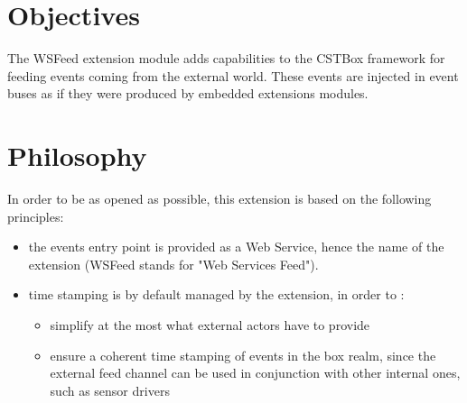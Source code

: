 \documentclass[11pt,a4paper]{article}
\author{Eric PASCUAL}
\title{\thetitle}
\date{Jan. 19, 2015}
\newcommand{\cbx}{CSTBox\xspace}
\newcommand{\wsf}{WSFeed\xspace}
\begin{document}
\maketitle

\begin{abstract}
This document describes the \wsf extension module for the \cbx.
\end{abstract}

\begin{versionhistory}
\end{versionhistory}

\setcounter{table}{0}	%

\clearpage
\tableofcontents

\clearpage
\setlength{\parskip}{0.5em}
\setlength{\parindent}{0pt}

\section{Objectives}

The \wsf extension module adds capabilities to the \cbx framework for feeding events 
coming from the external world. These events are injected in event buses as if they were 
produced by embedded extensions modules.

\section{Philosophy}

In order to be as opened as possible, this extension is based on the following principles:
\begin{itemize}
\item the events entry point is provided as a Web Service, 
hence the name of the extension (\wsf stands for "Web Services Feed").
\item time stamping is by default managed by the extension, in order to :
\begin{itemize}
\item simplify at the most what external actors have to provide
\item ensure a coherent time stamping of events in the box realm, since the external feed 
channel can be used in conjunction with other internal ones, such as sensor drivers
\end{itemize}
\end{itemize}
\end{document}
